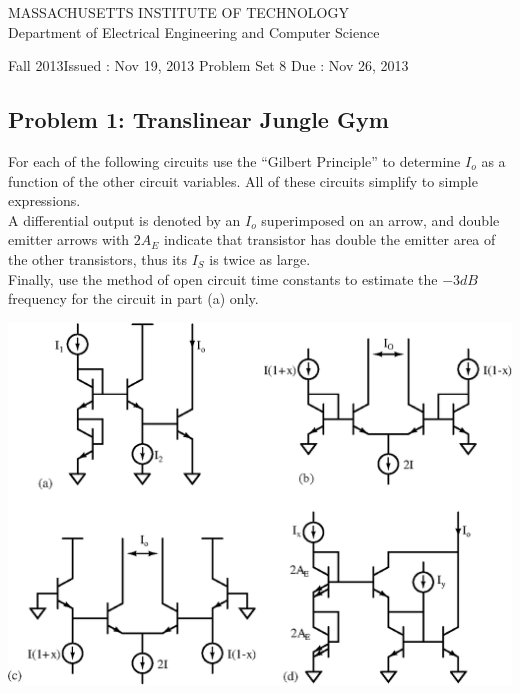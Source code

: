 \documentclass[11pt,twoside]{article}
\newlength{\toppush}
\newcommand{\htitle}[3]{\begin{center}
\vspace*{-\toppush}
{\large MASSACHUSETTS INSTITUTE OF TECHNOLOGY}\\
{\small Department of Electrical Engineering and Computer Science}\\
\vspace*{1ex}{\Large #2}\end{center}
\noindent
\newline\parbox{6.5in}
{Fall 2013\hfill Issued : #1 \newline
 Problem Set 8 \hfill Due : #3\newline
}}
\newcommand{\handout}[3]{\thispagestyle{empty}
\pagestyle{myheadings}\htitle{#1}{#2}{#3}}
\begin{document}
\handout{Nov 19, 2013}{6.301 Solid State Circuits}{Nov 26, 2013}
\setlength{\parindent}{0pt}

\newcommand{\solution}{
 \medskip
 {\bf Solution:}
}

\hrulefill

\flushleft

\subsection*{Problem 1: Translinear Jungle Gym}
For each of the following circuits use the “Gilbert Principle”
to determine $I_o$ as a function of the other circuit variables.
All of these circuits simplify to simple expressions. \\
A differential output is denoted by an $I_o$ superimposed on an arrow,
 and double emitter arrows with $2A_E$ indicate that transistor has double the emitter area of the other transistors, thus its $I_S$ is twice as large. \\
Finally, use the method of open circuit time constants to estimate the $-3dB$ frequency for the circuit in part (a) only.
\vspace{8ex}
\begin{center}
\includegraphics[width=.9\textwidth]{trans1.eps}
\end{center}
\end{document}
